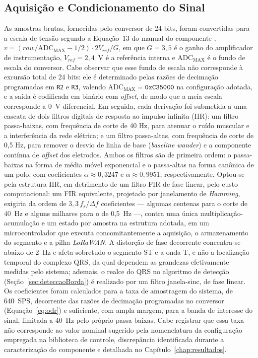 \subsection{Aquisição e Condicionamento do Sinal}
\label{sec:condicionamento}

As amostras brutas, fornecidas pelo conversor de 24 bits, foram convertidas para a escala de tensão segundo a Equação~13 do manual do componente \citep{TexasInstruments_ADS1293}, $v = \left(raw/\mathrm{ADC_{MAX}} - 1/2\right)\cdot 2V_{ref}/G$, em que $G = 3{,}5$ é o ganho do amplificador de instrumentação, $V_{ref} = 2{,}4$~V é a referência interna e $\mathrm{ADC_{MAX}}$ é o fundo de escala do conversor. Cabe observar que esse fundo de escala não corresponde à excursão total de 24 bits: ele é determinado pelas razões de decimação programadas em \texttt{R2} e \texttt{R3}, valendo $\mathrm{ADC_{MAX}} = \mathtt{0xC35000}$ na configuração adotada, e a saída é codificada em binário com \textit{offset}, de modo que a meia escala corresponde a 0~V diferencial. Em seguida, cada derivação foi submetida a uma cascata de dois filtros digitais de resposta ao impulso infinita (\acs{IIR}): um filtro passa-baixas, com frequência de corte de 40 Hz, para atenuar o ruído muscular e a interferência da rede elétrica; e um filtro passa-altas, com frequência de corte de 0,5 Hz, para remover o desvio de linha de base (\textit{baseline wander}) e a componente contínua de \textit{offset} dos eletrodos. Ambos os filtros são de primeira ordem: o passa-baixas na forma de média móvel exponencial e o passa-altas na forma canônica de um polo, com coeficientes $\alpha \approx 0{,}3247$ e $\alpha \approx 0{,}9951$, respectivamente. Optou-se pela estrutura \acs{IIR}, em detrimento de um filtro \acs{FIR} de fase linear, pelo custo computacional: um \acs{FIR} equivalente, projetado por janelamento de \textit{Hamming}, exigiria da ordem de $3{,}3\,f_s/\Delta f$ coeficientes --- algumas centenas para o corte de 40~Hz e alguns milhares para o de 0,5~Hz ---, contra uma única multiplicação-acumulação e um estado por amostra na estrutura adotada, em um microcontrolador que executa concomitantemente a aquisição, o armazenamento do segmento e a pilha \textit{LoRaWAN}. A distorção de fase decorrente concentra-se abaixo de 2~Hz e afeta sobretudo o segmento ST e a onda T, e não a localização temporal do complexo QRS, da qual dependem as grandezas efetivamente medidas pelo sistema; ademais, o realce do QRS no algoritmo de detecção (Seção~\ref{sec:deteccaoBorda}) é realizado por um filtro janela-sinc, de fase linear. Os coeficientes foram calculados para a taxa de amostragem do sistema, de 640~SPS, decorrente das razões de decimação programadas no conversor (Equação~\ref{eq:odr}) e suficiente, com ampla margem, para a banda de interesse do sinal, limitada a 40~Hz pelo próprio passa-baixas. Cabe registrar que essa taxa não corresponde ao valor nominal sugerido pela nomenclatura da configuração empregada na biblioteca de controle, discrepância identificada durante a caracterização do componente e detalhada no Capítulo~\ref{chap:resultados}.

